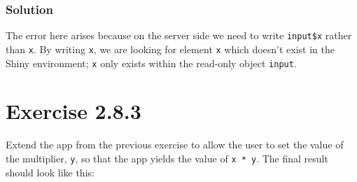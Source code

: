 \documentclass[]{book}
\newenvironment{Shaded}{\begin{snugshade}}{\end{snugshade}}
\newcommand{\ControlFlowTok}[1]{\textcolor[rgb]{0.13,0.29,0.53}{\textbf{#1}}}
\newcommand{\DataTypeTok}[1]{\textcolor[rgb]{0.13,0.29,0.53}{#1}}
\newcommand{\DecValTok}[1]{\textcolor[rgb]{0.00,0.00,0.81}{#1}}
\newcommand{\KeywordTok}[1]{\textcolor[rgb]{0.13,0.29,0.53}{\textbf{#1}}}
\newcommand{\NormalTok}[1]{#1}
\newcommand{\OperatorTok}[1]{\textcolor[rgb]{0.81,0.36,0.00}{\textbf{#1}}}
\newcommand{\StringTok}[1]{\textcolor[rgb]{0.31,0.60,0.02}{#1}}
\begin{document}
\begin{solution}

\hypertarget{solution-1}{%
\subsubsection*{Solution}\label{solution-1}}

The error here arises because on the server side we need to write \texttt{input\$x}
rather than \texttt{x}. By writing \texttt{x}, we are looking for element \texttt{x} which doesn't
exist in the Shiny environment; \texttt{x} only exists within the read-only object
\texttt{input}.

\begin{Shaded}
\end{Shaded}

\end{solution}

\hypertarget{exercise-2.8.3}{%
\section*{Exercise 2.8.3}\label{exercise-2.8.3}}

Extend the app from the previous exercise to allow the user to set the value of
the multiplier, \texttt{y}, so that the app yields the value of \texttt{x\ *\ y}. The final
result should look like this:
\end{document}
